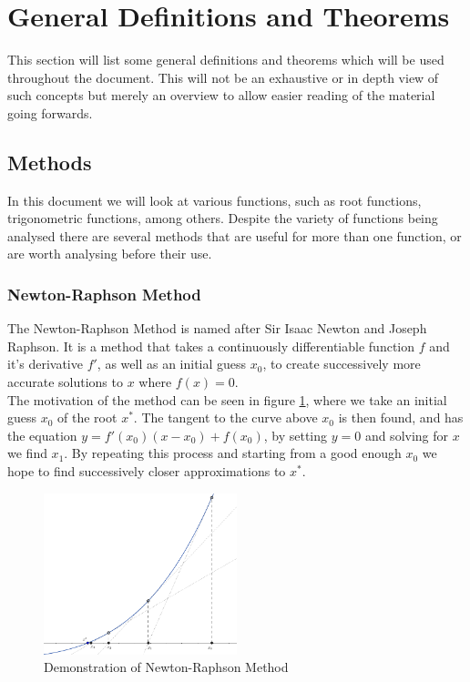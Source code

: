 \section{General Definitions and Theorems}
\label{SEC_"General Definitions and Theorems"}

This section will list some general definitions and theorems which will be used throughout the document. This will not be an exhaustive or in depth view of such concepts but merely an overview to allow easier reading of the material going forwards.

\subsection{Methods}

In this document we will look at various functions, such as root functions, trigonometric functions, among others. Despite the variety of functions being analysed there are several methods that are useful for more than one function, or are worth analysing before their use.

\subsubsection{Newton-Raphson Method}
\label{SUBSUB_"Newton-Raphson Method"}

\theoremstyle{definition}
\newtheorem{Newton Method}{Definition}[subsubsection]

The Newton-Raphson Method is named after Sir Isaac Newton and Joseph Raphson. It is a method that takes a continuously differentiable function \(f\) and it's derivative \(f'\), as well as an initial guess \(x_0\), to create successively more accurate solutions to \(x\) where \(f(x) = 0\).\\

The motivation of the method can be seen in figure \ref{FIG_"Newton-Raphson Demonstration"}, where we take an initial guess \(x_0\) of the root \(x^\ast\). The tangent to the curve above \(x_0\) is then found, and has the equation \(y = f'(x_0)(x-x_0) + f(x_0)\), by setting \(y = 0\) and solving for \(x\) we find \(x_1\). By repeating this process and starting from a good enough \(x_0\) we hope to find successively closer approximations to \(x^\ast\).

\begin{figure}[!ht]
	\label{FIG_"Newton-Raphson Demonstration"}
	\caption{Demonstration of Newton-Raphson Method}
	\centering
	\includegraphics[width=0.5\textwidth]{"./Diagrams/Newton-Raphson Diagram"}
\end{figure}

